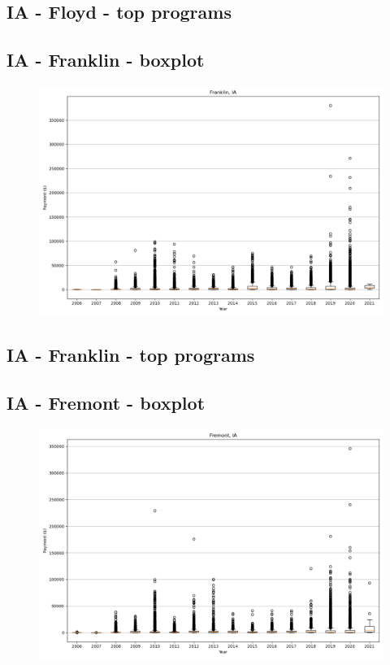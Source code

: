 \subsection*{IA - Floyd - top programs}

\newpage
\subsection*{IA - Franklin - boxplot}
\begin{figure}[h]
\centering
\includegraphics[width=7in]{../output/boxplots/counties/Franklin-IA_boxplot.png}
\end{figure}


\subsection*{IA - Franklin - top programs}

\newpage
\subsection*{IA - Fremont - boxplot}
\begin{figure}[h]
\centering
\includegraphics[width=7in]{../output/boxplots/counties/Fremont-IA_boxplot.png}
\end{figure}


